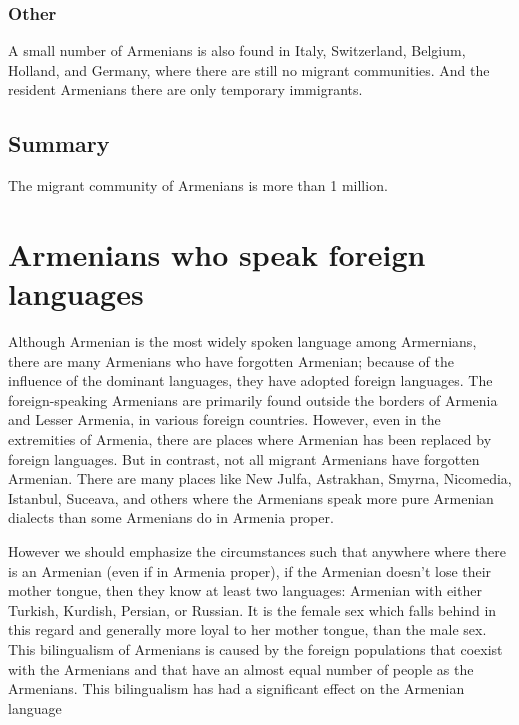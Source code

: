 \begin{adjarianpage}\label{page:30}\end{adjarianpage}%

\subsection{Other}

A small number of Armenians is also found in Italy, Switzerland, Belgium, Holland, and Germany, where there are still no migrant communities. And the resident Armenians there are only temporary immigrants.

\section{Summary}
The migrant community of Armenians is more than 1 million.

\chapter{Armenians who speak foreign languages}\label{chapter:NonSpeaking}

Although Armenian is the most widely spoken language among Armernians, there are many Armenians who have forgotten Armenian; because of the influence of the dominant languages, they have adopted foreign languages. The foreign-speaking Armenians are primarily found outside the borders of Armenia and Lesser Armenia, in various foreign countries. However, even in the extremities of Armenia, there are places where Armenian has been replaced by foreign languages. But in contrast, not all migrant Armenians have forgotten Armenian. There are many places like New Julfa, Astrakhan, Smyrna, Nicomedia, Istanbul, Suceava, and others where the Armenians speak more pure Armenian dialects than some Armenians do in Armenia proper. 

However we should emphasize the circumstances such that anywhere where there is an Armenian (even if in Armenia proper), if the Armenian doesn't lose their mother tongue, then they know at least two languages: Armenian with either Turkish, Kurdish, Persian, or Russian. It is the female sex which falls behind in this regard and generally more loyal to her mother tongue, than the male sex. This bilingualism of Armenians is caused by the foreign populations that coexist with the Armenians and that have an almost equal number of people as the Armenians. This bilingualism has had a significant effect on the Armenian language

